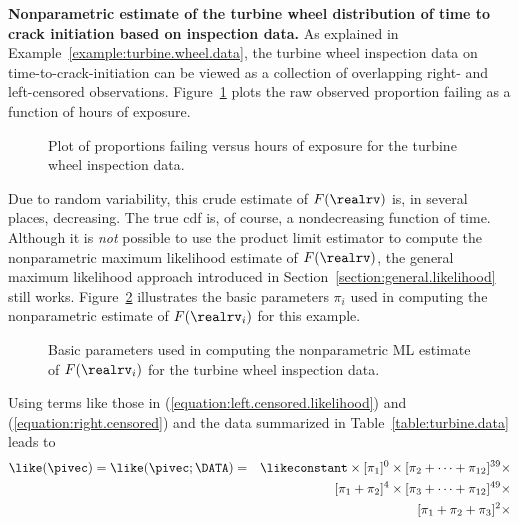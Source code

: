 \begin{example}
\label{example:turbine.cdfest}
{\bf Nonparametric estimate of the turbine wheel distribution of
time to crack initiation based on inspection data.} As explained in
Example~\ref{example:turbine.wheel.data}, the turbine wheel inspection
data on time-to-crack-initiation can be viewed as a collection of
overlapping right- and left-censored observations.
Figure~\ref{figure:turbine.rawcdf.ps} plots the raw observed
proportion failing as a function of hours of exposure.
\begin{figure}
\caption{Plot of proportions failing 
versus hours of exposure for the turbine wheel inspection data.}
\label{figure:turbine.rawcdf.ps}
\end{figure}
Due to random variability, this crude estimate of $F(\realrv)$ is, in
several places, decreasing. The true cdf is, of course, a
nondecreasing function of time.  Although it is {\em not} possible to use
the product limit estimator to compute the nonparametric maximum
likelihood estimate of $F(\realrv)$, the general maximum likelihood
approach introduced in Section~\ref{section:general.likelihood} still
works.  Figure~\ref{figure:turbine.npmldatafig.ps} illustrates the
basic parameters $\pi_{i}$ used in computing the nonparametric estimate of
$F(\realrv_{i})$ for this example.
\begin{figure}
\caption{Basic parameters used in computing the nonparametric ML
estimate of $F(\realrv_{i})$ for the turbine wheel inspection data.}
\label{figure:turbine.npmldatafig.ps}
\end{figure}
Using terms like those in (\ref{equation:left.censored.likelihood})
and (\ref{equation:right.censored}) and the data summarized in
Table~\ref{table:turbine.data} leads to
\begin{eqnarray*}
\like(\pivec)=
\like(\pivec;\DATA)&=& \likeconstant \times  
	[ \pi_{1}]^{0} \times  
	[ \pi_{2} + \cdots +\pi_{12}]^{39} \times  \\
&&	[ \pi_{1}+\pi_{2}]^{4} \times  
	[ \pi_{3} + \cdots +\pi_{12}]^{49} \times  \\
&&	[ \pi_{1}+ \pi_{2} +\pi_{3}]^{2} \times  

\end{eqnarray*}
\end{example}
